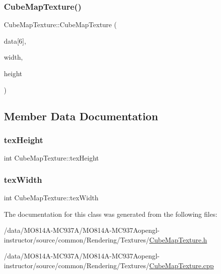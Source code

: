 \subsubsection{\texorpdfstring{Cube\+Map\+Texture()}{CubeMapTexture()}}
{\footnotesize\ttfamily Cube\+Map\+Texture\+::\+Cube\+Map\+Texture (\begin{DoxyParamCaption}\item[{G\+Lubyte $\ast$}]{data\mbox{[}6\mbox{]},  }\item[{int}]{width,  }\item[{int}]{height }\end{DoxyParamCaption})}



\subsection{Member Data Documentation}
\hypertarget{class_cube_map_texture_ad7cb6fe0f1405749dac36016772b4de9}{}\label{class_cube_map_texture_ad7cb6fe0f1405749dac36016772b4de9}
\subsubsection{\texorpdfstring{tex\+Height}{texHeight}}
{\footnotesize\ttfamily int Cube\+Map\+Texture\+::tex\+Height\hspace{0.3cm}{\ttfamily [private]}}

\hypertarget{class_cube_map_texture_a7890234be6ca631a5f17a9ab9d7e597c}{}\label{class_cube_map_texture_a7890234be6ca631a5f17a9ab9d7e597c}
\subsubsection{\texorpdfstring{tex\+Width}{texWidth}}
{\footnotesize\ttfamily int Cube\+Map\+Texture\+::tex\+Width\hspace{0.3cm}{\ttfamily [private]}}



The documentation for this class was generated from the following files\+:\begin{DoxyCompactItemize}
\item
/data/MO814A-MC937A/MO814A-MC937Aopengl-\/instructor/source/common/\+Rendering/\+Textures/\hyperlink{_cube_map_texture_8h}{Cube\+Map\+Texture.\+h}\item
/data/MO814A-MC937A/MO814A-MC937Aopengl-\/instructor/source/common/\+Rendering/\+Textures/\hyperlink{_cube_map_texture_8cpp}{Cube\+Map\+Texture.\+cpp}\end{DoxyCompactItemize}
